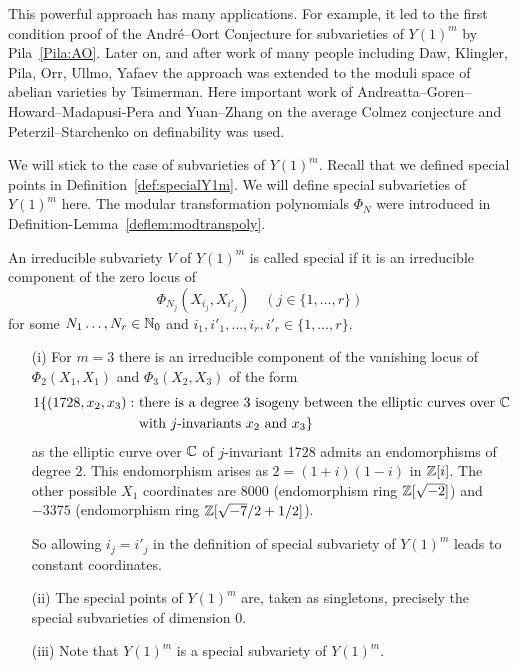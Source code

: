 This powerful approach has many applications. For example, it led to
the first condition proof of the Andr\'e--Oort Conjecture for
subvarieties of $Y(1)^m$ by Pila~\ref{Pila:AO}. Later on, and after work of
many people including Daw, Klingler, Pila, Orr, Ullmo, Yafaev the
approach was extended to the moduli space of abelian varieties by
Tsimerman. Here important work of
Andreatta--Goren--Howard--Madapusi-Pera and Yuan--Zhang on the average
Colmez conjecture and Peterzil--Starchenko on definability was used.

We will stick to the case of subvarieties of $Y(1)^m$.
Recall that we defined special points in
Definition~\ref{def:specialY1m}. We will define special subvarieties
of $Y(1)^m$ here. The modular transformation polynomials $\Phi_N$
were introduced in Definition-Lemma~\ref{deflem:modtranspoly}. 

\begin{definition}
  An irreducible subvariety $V$ of $Y(1)^m$ is called special if it is
  an irreducible component of the zero locus of
  \begin{equation*}
    \Phi_{N_j}(X_{i_j},X_{i'_j}) \quad (j\in \{1,\ldots,r\})
  \end{equation*}
  for some  $N_1\ldots,N_r\in{\mathbb{N}}_0$ and $i_1,i'_1,\ldots,i_r,i'_r\in
  \{1,\ldots,r\}$. 
\end{definition}

\begin{example}
  \begin{enumerate}
  \item [(i)]
    For $m=3$ there is an irreducible component of the vanishing locus of
    $\Phi_2(X_1,X_1)$ and $\Phi_3(X_2,X_3)$ of the form
    \begin{alignat*}1
      \{(1728,x_2,x_3) : \,\,&\text{there is a degree $3$ isogeny between
        the elliptic curves over $\IC$}\\ &\text{with $j$-invariants $x_2$ and $x_3$}\}
    \end{alignat*}
    as the elliptic curve over ${\mathbb{C}}$  of $j$-invariant 1728
    admits an endomorphisms of degree $2$. This endomorphism arises as
    $2 = (1+i)(1-i)$ in ${\mathbb{Z}}[i]$. The other possible $X_1$ 
    coordinates are $8000$ (endomorphism ring ${\mathbb{Z}}[\sqrt{-2}]$) and
    $-3375$ (endomorphism ring ${\mathbb{Z}}[\sqrt{-7}/2+1/2]$).

    So allowing $i_j=i'_j$ in the definition of special subvariety of
    $Y(1)^m$ leads to constant coordinates. 
  \item[(ii)] The special points of $Y(1)^m$ are, taken as singletons,
    precisely the special subvarieties of dimension $0$.
  \item[(iii)] Note that $Y(1)^m$ is a special subvariety of $Y(1)^m$. 
  \end{enumerate}
\end{example}


